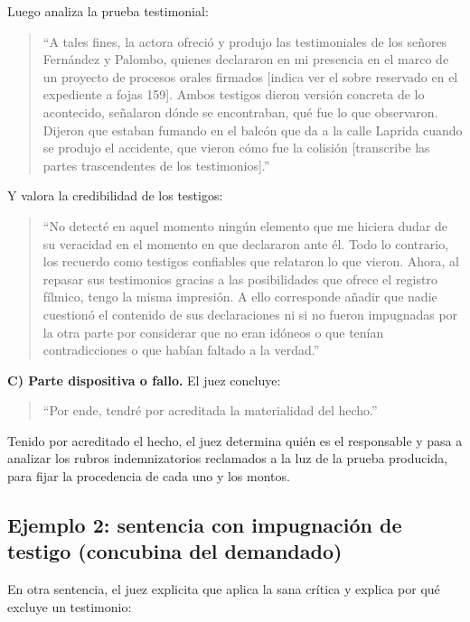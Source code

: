 \documentclass[12pt,oneside]{book}
\begin{document}
Luego analiza la prueba testimonial:

\begin{quote}
``A tales fines, la actora ofreció y produjo las testimoniales de los señores Fernández y Palombo, quienes declararon en mi presencia en el marco de un proyecto de procesos orales firmados [indica ver el sobre reservado en el expediente a fojas 159]. Ambos testigos dieron versión concreta de lo acontecido, señalaron dónde se encontraban, qué fue lo que observaron. Dijeron que estaban fumando en el balcón que da a la calle Laprida cuando se produjo el accidente, que vieron cómo fue la colisión [transcribe las partes trascendentes de los testimonios].''
\end{quote}

Y valora la credibilidad de los testigos:

\begin{quote}
``No detecté en aquel momento ningún elemento que me hiciera dudar de su veracidad en el momento en que declararon ante él. Todo lo contrario, los recuerdo como testigos confiables que relataron lo que vieron. Ahora, al repasar sus testimonios gracias a las posibilidades que ofrece el registro fílmico, tengo la misma impresión. A ello corresponde añadir que nadie cuestionó el contenido de sus declaraciones ni si no fueron impugnadas por la otra parte por considerar que no eran idóneos o que tenían contradicciones o que habían faltado a la verdad.''
\end{quote}

\textbf{C) Parte dispositiva o fallo.} El juez concluye:

\begin{quote}
``Por ende, tendré por acreditada la materialidad del hecho.''
\end{quote}

Tenido por acreditado el hecho, el juez determina quién es el responsable y pasa a analizar los rubros indemnizatorios reclamados a la luz de la prueba producida, para fijar la procedencia de cada uno y los montos.

\subsection{Ejemplo 2: sentencia con impugnación de testigo (concubina del demandado)}

En otra sentencia, el juez explicita que aplica la sana crítica y explica por qué excluye un testimonio:
\end{document}
